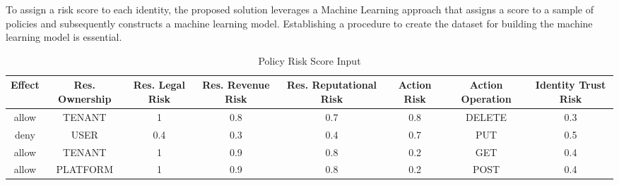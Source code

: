 \vspace{15pt}

To assign a risk score to each identity, the proposed solution leverages a Machine Learning approach that assigns a score to a sample of policies and subsequently constructs a machine learning model. 
Establishing a procedure to create the dataset for building the machine learning model is essential.

\begin{table*}[htbp]
    \caption{Policy Risk Score Input}
    \label{table:table-policy-risk-score}
    \begin{center}
    \begin{tabular}{|c|c|c|c|c|c|c|c|}
    \hline
    Effect & Res. Ownership & Res. Legal Risk & Res. Revenue Risk & Res. Reputational Risk & Action Risk &  Action Operation & Identity Trust Risk \\
    \hline
    allow & TENANT & 1 & 0.8 & 0.7 & 0.8 & DELETE & 0.3\\
    \hline
    deny & USER & 0.4 & 0.3 & 0.4 & 0.7 & PUT & 0.5\\
    \hline
    allow & TENANT & 1 & 0.9 & 0.8 & 0.2 & GET & 0.4\\
    \hline
    allow & PLATFORM & 1 & 0.9 & 0.8 & 0.2 & POST & 0.4\\
    \hline
    \end{tabular}
    \end{center}
\end{table*}

